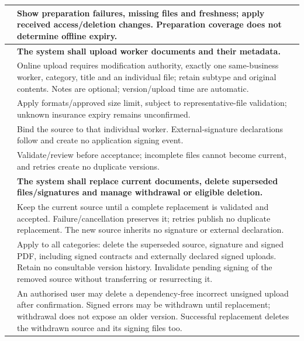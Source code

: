 {\begin{longtable}{L{0.18}L{0.82}}
\label{ac:039:b} & Show preparation failures, missing files and freshness; apply received access/deletion changes. Preparation coverage does not determine offline expiry.\\
\midrule
{}
\label{fr:040}\textbf{} & \textbf{The system shall upload worker documents and their metadata.}\\*
\label{ac:040:a} & Online upload requires modification authority, exactly one same-business worker, category, title and an individual file; retain subtype and original contents. Notes are optional; version/upload time are automatic.\\
\label{ac:040:b} & Apply  formats/approved size limit, subject to representative-file validation; unknown insurance expiry remains unconfirmed.\\
\label{ac:040:c} & Bind the source to that individual worker. External-signature declarations follow  and create no application signing event.\\
\label{ac:040:d} & Validate/review before acceptance; incomplete files cannot become current, and retries create no duplicate versions.\\
\midrule
{}
\label{fr:041}\textbf{} & \textbf{The system shall replace current documents, delete superseded files/signatures and manage withdrawal or eligible deletion.}\\*
\label{ac:041:a} & Keep the current source until a complete replacement is validated and accepted. Failure/cancellation preserves it; retries publish no duplicate replacement. The new source inherits no signature or external declaration.\\
\label{ac:041:b} & Apply  to all categories: delete the superseded source, signature and signed PDF, including signed contracts and externally declared signed uploads. Retain no consultable version history. Invalidate pending signing of the removed source without transferring or resurrecting it.\\
\label{ac:041:c} & An authorised user may delete a dependency-free incorrect unsigned upload after confirmation. Signed errors may be withdrawn until replacement; withdrawal does not expose an older version. Successful replacement deletes the withdrawn source and its signing files too.\\

\end{longtable}}
